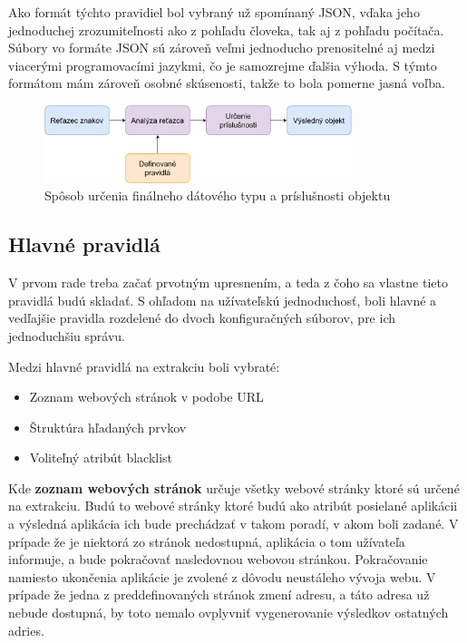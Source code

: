 Ako formát týchto pravidiel bol vybraný už spomínaný JSON, vďaka jeho jednoduchej zrozumiteľnosti ako z pohľadu človeka, tak aj z pohľadu počítača. Súbory vo formáte JSON sú zároveň veľmi jednoducho prenositelné aj medzi viacerými programovacími jazykmi, čo je samozrejme ďalšia výhoda. S týmto formátom mám zároveň osobné skúsenosti, takže to bola pomerne jasná voľba.

\bigskip

\begin{figure}[hbt]
	\centering
	\includegraphics[width=0.8\textwidth]{obrazky-figures/rules.pdf}
	\caption{Spôsob určenia finálneho dátového typu a príslušnosti objektu}
	\label{rules}
\end{figure}

\bigskip

\subsection{Hlavné pravidlá}

V prvom rade treba začať prvotným upresnením, a teda z čoho sa vlastne tieto pravidlá budú skladať. S ohľadom na užívateľskú jednoduchosť, boli hlavné a vedľajšie pravidla rozdelené do dvoch konfiguračných súborov, pre ich jednoduchšiu správu. 

Medzi hlavné pravidlá na extrakciu boli vybraté:
\begin{itemize}
    \item {Zoznam webových stránok v podobe URL}
    \item {Štruktúra hľadaných prvkov}
    \item {Voliteľný atribút blacklist}
\end{itemize}

\bigskip

Kde \textbf{zoznam webových stránok} určuje všetky webové stránky ktoré sú určené na extrakciu. Budú to webové stránky ktoré budú ako atribút posielané aplikácii a výsledná aplikácia ich bude prechádzať v takom poradí, v akom boli zadané. V prípade že je niektorá zo stránok nedostupná, aplikácia o tom užívateľa informuje, a bude pokračovať nasledovnou webovou stránkou. Pokračovanie namiesto ukončenia aplikácie je zvolené z dôvodu neustáleho vývoja webu. V prípade že jedna z preddefinovaných stránok zmení adresu, a táto adresa už nebude dostupná, by toto nemalo ovplyvniť vygenerovanie výsledkov ostatných adries.

